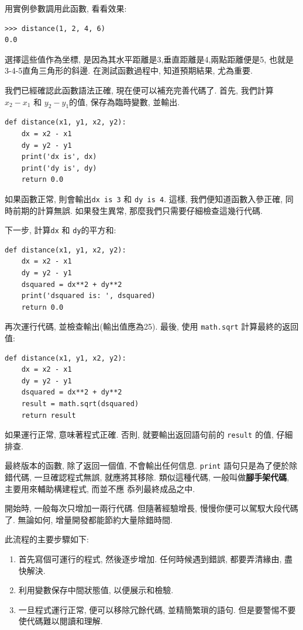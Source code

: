 \documentclass[10pt]{book}
\begin{document}
用實例參數調用此函數, 看看效果:

\begin{verbatim}
>>> distance(1, 2, 4, 6)
0.0
\end{verbatim}
%
選擇這些值作為坐標, 是因為其水平距離是3,垂直距離是4,兩點距離便是5, 
也就是3-4-5直角三角形的斜邊. 
在測試函數過程中, 知道預期結果, 尤為重要. 

我們已經確認此函數語法正確, 現在便可以補充完善代碼了. 
首先, 我們計算$x_2 - x_1$ 和 $y_2 - y_1$的值, 保存為臨時變數, 並輸出. 

\begin{verbatim}
def distance(x1, y1, x2, y2):
    dx = x2 - x1
    dy = y2 - y1
    print('dx is', dx)
    print('dy is', dy)
    return 0.0
\end{verbatim}
%
如果函數正常, 則會輸出\verb"dx is 3" 和 \verb"dy is 4". 
這樣, 我們便知道函數入參正確, 同時前期的計算無誤. 
如果發生異常, 那麼我們只需要仔細檢查這幾行代碼. 

下一步, 計算{\tt dx} 和 {\tt dy}的平方和:

\begin{verbatim}
def distance(x1, y1, x2, y2):
    dx = x2 - x1
    dy = y2 - y1
    dsquared = dx**2 + dy**2
    print('dsquared is: ', dsquared)
    return 0.0
\end{verbatim}
%
再次運行代碼, 並檢查輸出(輸出值應為25). 
最後, 使用 {\tt math.sqrt} 計算最終的返回值:

\begin{verbatim}
def distance(x1, y1, x2, y2):
    dx = x2 - x1
    dy = y2 - y1
    dsquared = dx**2 + dy**2
    result = math.sqrt(dsquared)
    return result
\end{verbatim}
%
如果運行正常, 意味著程式正確. 
否則, 就要輸出返回語句前的 {\tt result} 的值, 仔細排查. 

最終版本的函數, 除了返回一個值, 不會輸出任何信息. 
{\tt print} 語句只是為了便於除錯代碼, 一旦確認程式無誤, 就應將其移除. 
類似這種代碼, 一般叫做{\bf 腳手架代碼},  主要用來輔助構建程式, 而並不應
忝列最終成品之中. 

開始時, 一般每次只增加一兩行代碼. 但隨著經驗增長, 慢慢你便可以駕馭大段代碼了. 
無論如何, 增量開發都能節約大量除錯時間.

此流程的主要步驟如下:

\begin{enumerate}

\item 首先寫個可運行的程式, 然後逐步增加. 任何時候遇到錯誤, 都要弄清緣由, 盡快解決. 

\item 利用變數保存中間狀態值, 以便展示和檢驗. 

\item 一旦程式運行正常, 便可以移除冗餘代碼, 並精簡繁瑣的語句. 
但是要警惕不要使代碼難以閱讀和理解. 

\end{enumerate}
\end{document}
